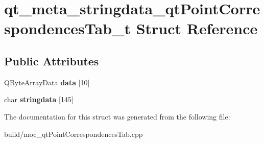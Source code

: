 \hypertarget{structqt__meta__stringdata__qt_point_correspondences_tab__t}{}\section{qt\+\_\+meta\+\_\+stringdata\+\_\+qt\+Point\+Correspondences\+Tab\+\_\+t Struct Reference}
\label{structqt__meta__stringdata__qt_point_correspondences_tab__t}
\subsection*{Public Attributes}
\begin{DoxyCompactItemize}
\item 
\hypertarget{structqt__meta__stringdata__qt_point_correspondences_tab__t_a450726e2617de14858a34e91e4196c3d}{}Q\+Byte\+Array\+Data {\bfseries data} \mbox{[}10\mbox{]}\label{structqt__meta__stringdata__qt_point_correspondences_tab__t_a450726e2617de14858a34e91e4196c3d}

\item 
\hypertarget{structqt__meta__stringdata__qt_point_correspondences_tab__t_ac329e2c80b7e2da97fcd090d102b5cb1}{}char {\bfseries stringdata} \mbox{[}145\mbox{]}\label{structqt__meta__stringdata__qt_point_correspondences_tab__t_ac329e2c80b7e2da97fcd090d102b5cb1}

\end{DoxyCompactItemize}


The documentation for this struct was generated from the following file\+:\begin{DoxyCompactItemize}
\item 
build/moc\+\_\+qt\+Point\+Correspondences\+Tab.\+cpp\end{DoxyCompactItemize}
